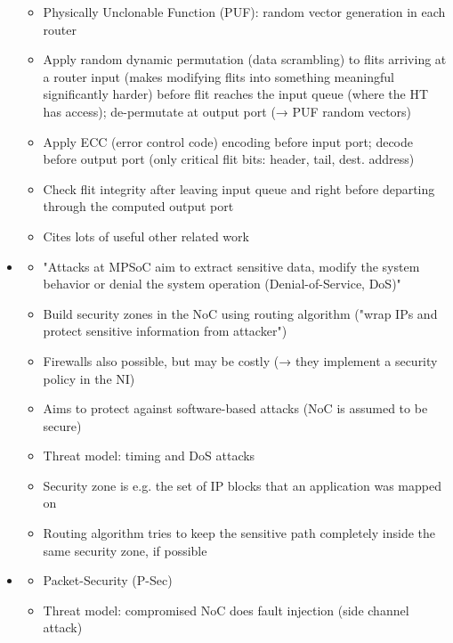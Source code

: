 \begin{itemize}
\begin{itemize}
            \item Physically Unclonable Function (PUF): random vector generation in each router
            \item Apply random dynamic permutation (data scrambling) to flits arriving at a router input (makes modifying flits into something
                meaningful significantly harder) before flit reaches the input queue (where the HT has access); de-permutate at output port (→
                PUF random vectors)
            \item Apply ECC (error control code) encoding before input port; decode before output port (only critical flit bits: header, tail,
                dest. address)
            \item Check flit integrity after leaving input queue and right before departing through the computed output port
            \item Cites lots of useful other related work
        \end{itemize}
    \item \textbf{}
        \begin{itemize}
            \item "Attacks at MPSoC aim to extract sensitive data, modify the system behavior or denial the system operation (Denial-of-Service,
                DoS)"
            \item Build security zones in the NoC using routing algorithm ("wrap IPs and protect sensitive information from attacker")
            \item Firewalls also possible, but may be costly (→ they implement a security policy in the NI)
            \item Aims to protect against software-based attacks (NoC is assumed to be secure)
            \item Threat model: timing and DoS attacks
            \item Security zone is e.g. the set of IP blocks that an application was mapped on
            \item Routing algorithm tries to keep the sensitive path completely inside the same security zone, if possible
        \end{itemize}
    \item \textbf{}
        \begin{itemize}
            \item Packet-Security (P-Sec)
            \item Threat model: compromised NoC does fault injection (side channel attack)

\end{itemize}
\end{itemize}
